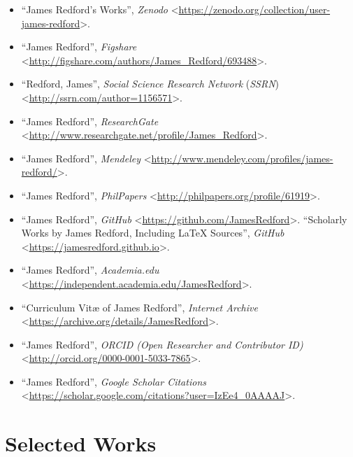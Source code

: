 \documentclass[letterpaper,12pt]{article}
\begin{document}
\begin{itemize}
\small
\item ``James Redford's Works'', \emph{Zenodo} \textless\url{https://zenodo.org/collection/user-james-redford}\textgreater .

\item ``James Redford'', \emph{Figshare} \textless\url{http://figshare.com/authors/James_Redford/693488}\textgreater .

\item ``Redford, James'', \emph{Social Science Research Network} (\emph{SSRN}) \textless\url{http://ssrn.com/author=1156571}\textgreater .

\item ``James Redford'', \emph{ResearchGate} \textless\url{http://www.researchgate.net/profile/James_Redford}\textgreater .

\item ``James Redford'', \emph{Mendeley} \textless\url{http://www.mendeley.com/profiles/james-redford/}\textgreater .

\item ``James Redford'', \emph{PhilPapers} \textless\url{http://philpapers.org/profile/61919}\textgreater .

\item ``James Redford'', \emph{GitHub} \textless\url{https://github.com/JamesRedford}\textgreater . ``Scholarly Works by James Redford, Including LaTeX Sources'', \emph{GitHub} \textless\url{https://jamesredford.github.io}\textgreater .

\item ``James Redford'', \emph{Academia.edu} \textless\url{https://independent.academia.edu/JamesRedford}\textgreater .

\item ``Curriculum Vit{\ae} of James Redford'', \emph{Internet Archive} \textless\url{https://archive.org/details/JamesRedford}\textgreater .

\item ``James Redford'', \emph{ORCID (Open Researcher and Contributor ID)} \textless\url{http://orcid.org/0000-0001-5033-7865}\textgreater .

\item ``James Redford'', \emph{Google Scholar Citations} \textless\url{https://scholar.google.com/citations?user=IzEe4_0AAAAJ}\textgreater .
\end{itemize}

\section{Selected Works}
\label{sec:SelectedWorks}
\end{document}
